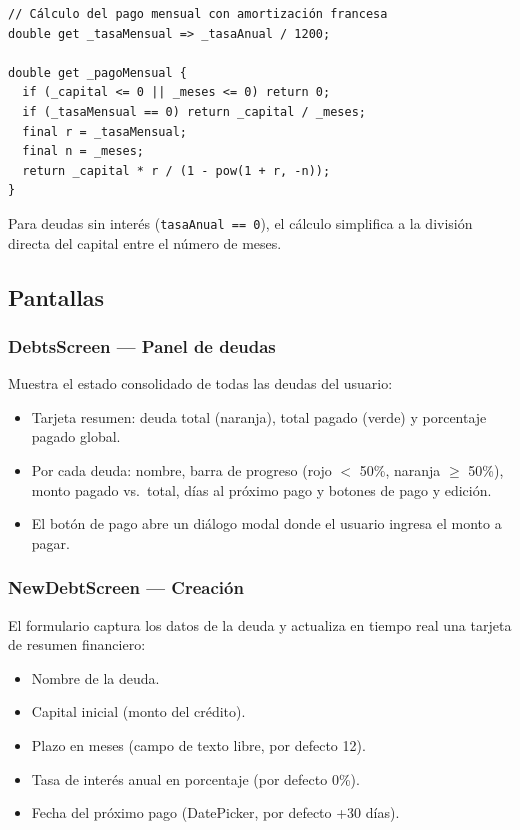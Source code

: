 \documentclass[12pt, letterpaper]{article}
\newcommand{\campo}[1]{\texttt{#1}}
\begin{document}
\begin{lstlisting}
// Cálculo del pago mensual con amortización francesa
double get _tasaMensual => _tasaAnual / 1200;

double get _pagoMensual {
  if (_capital <= 0 || _meses <= 0) return 0;
  if (_tasaMensual == 0) return _capital / _meses;
  final r = _tasaMensual;
  final n = _meses;
  return _capital * r / (1 - pow(1 + r, -n));
}
\end{lstlisting}

Para deudas sin interés (\campo{tasaAnual == 0}), el cálculo simplifica a
la división directa del capital entre el número de meses.

\subsection{Pantallas}

\subsubsection{DebtsScreen — Panel de deudas}

Muestra el estado consolidado de todas las deudas del usuario:

\begin{itemize}
  \item Tarjeta resumen: deuda total (naranja), total pagado (verde) y
        porcentaje pagado global.
  \item Por cada deuda: nombre, barra de progreso (rojo $<$ 50\%,
        naranja $\geq$ 50\%), monto pagado vs.\ total, días al próximo pago
        y botones de pago y edición.
  \item El botón de pago abre un diálogo modal donde el usuario ingresa
        el monto a pagar.
\end{itemize}

\subsubsection{NewDebtScreen — Creación}

El formulario captura los datos de la deuda y actualiza en tiempo real
una tarjeta de resumen financiero:

\begin{itemize}
  \item Nombre de la deuda.
  \item Capital inicial (monto del crédito).
  \item Plazo en meses (campo de texto libre, por defecto 12).
  \item Tasa de interés anual en porcentaje (por defecto 0\%).
  \item Fecha del próximo pago (DatePicker, por defecto +30 días).
\end{itemize}
\end{document}
